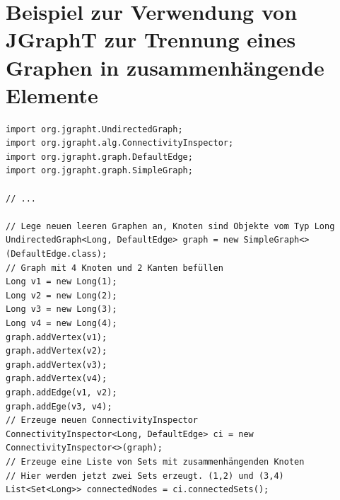 \section{Beispiel zur Verwendung von JGraphT zur Trennung eines Graphen in zusammenhängende Elemente}
\label{sec:appendix:jgrapht_separation}
\begin{lstlisting}
import org.jgrapht.UndirectedGraph;
import org.jgrapht.alg.ConnectivityInspector;
import org.jgrapht.graph.DefaultEdge;
import org.jgrapht.graph.SimpleGraph;

// ...
 
// Lege neuen leeren Graphen an, Knoten sind Objekte vom Typ Long
UndirectedGraph<Long, DefaultEdge> graph = new SimpleGraph<>(DefaultEdge.class);
// Graph mit 4 Knoten und 2 Kanten befüllen
Long v1 = new Long(1);
Long v2 = new Long(2);
Long v3 = new Long(3);
Long v4 = new Long(4);
graph.addVertex(v1);
graph.addVertex(v2);
graph.addVertex(v3);
graph.addVertex(v4);
graph.addEdge(v1, v2);
graph.addEge(v3, v4);
// Erzeuge neuen ConnectivityInspector
ConnectivityInspector<Long, DefaultEdge> ci = new ConnectivityInspector<>(graph);
// Erzeuge eine Liste von Sets mit zusammenhängenden Knoten
// Hier werden jetzt zwei Sets erzeugt. (1,2) und (3,4)
List<Set<Long>> connectedNodes = ci.connectedSets(); 
\end{lstlisting}
  
